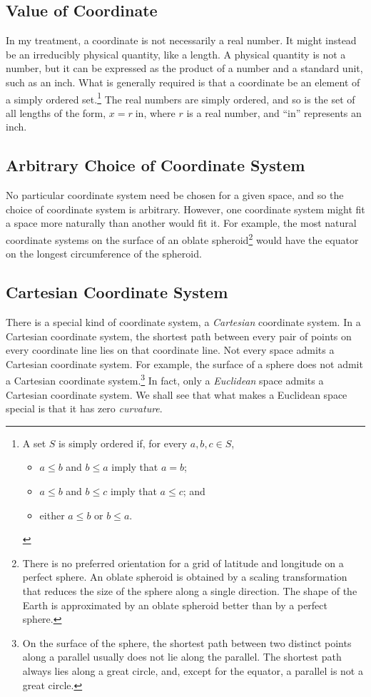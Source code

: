 \subsection{Value of Coordinate}

In my treatment, a coordinate is not necessarily a real number.  It might
instead be an irreducibly physical quantity, like a length.  A physical
quantity is not a number, but it can be expressed as the product of a number
and a standard unit, such as an inch.  What is generally required is that a
coordinate be an element of a simply ordered set.\footnote{%
   A set $S$ is simply ordered if, for every $a, b, c \in S$,
   \begin{itemize}[noitemsep]
      \item $a \leq b$ and $b \leq a$ imply that $a = b$;
      \item $a \leq b$ and $b \leq c$ imply that $a \leq c$; and
      \item either $a \leq b$ or $b \leq a$.
   \end{itemize}%
}
The real numbers are simply ordered, and so is the set of all lengths of the
form, $x = r \; \text{in}$, where $r$ is a real number, and ``$\text{in}$''
represents an inch.

\subsection{Arbitrary Choice of Coordinate System}

No particular coordinate system need be chosen for a given space, and so the
choice of coordinate system is arbitrary.  However, one coordinate system might
fit a space more naturally than another would fit it.  For example, the most
natural coordinate systems on the surface of an oblate
spheroid\footnote{%
   There is no preferred orientation for a grid of latitude and longitude on a
   perfect sphere.  An oblate spheroid is obtained by a scaling transformation
   that reduces the size of the sphere along a single direction.  The shape of
   the Earth is approximated by an oblate spheroid better than by a perfect
   sphere.%
}
would have the equator on the longest circumference of the spheroid.

\subsection{Cartesian Coordinate System}

There is a special kind of coordinate system, a \emph{Cartesian} coordinate
system.  In a Cartesian coordinate system, the shortest path between every pair
of points on every coordinate line lies on that coordinate line.  Not every
space admits a Cartesian coordinate system.  For example, the surface of a
sphere does not admit a Cartesian coordinate system.\footnote{%
   On the surface of the sphere, the shortest path between two distinct points
   along a parallel usually does not lie along the parallel.  The shortest path
   always lies along a great circle, and, except for the equator, a parallel is
   not a great circle.%
}
In fact, only a \emph{Euclidean} space admits a Cartesian coordinate system.
We shall see that what makes a Euclidean space special is that it has zero
\emph{curvature}.

